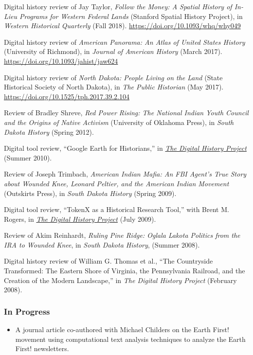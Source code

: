 Digital history review of Jay Taylor, \emph{Follow the Money: A Spatial
History of In-Lieu Programs for Western Federal Lands} (Stanford Spatial
History Project), in \emph{Western Historical Quarterly} (Fall 2018).
\url{https://doi.org/10.1093/whq/why049}

Digital history review of \emph{American Panorama: An Atlas of United
States History} (University of Richmond), in \emph{Journal of American
History} (March 2017). \url{https://doi.org/10.1093/jahist/jaw624}

Digital history review of \emph{North Dakota: People Living on the Land}
(State Historical Society of North Dakota), in \emph{The Public
Historian} (May 2017). \url{https://doi.org/10.1525/tph.2017.39.2.104}

Review of Bradley Shreve, \emph{Red Power Rising: The National Indian
Youth Council and the Origins of Native Activism} (University of
Oklahoma Press), in \emph{South Dakota History} (Spring 2012).

Digital tool review, ``Google Earth for Historians,'' in
\emph{\href{http://digitalhistory.unl.edu/t-reviews/geheppler.php}{The
Digital History Project}} (Summer 2010).

Review of Joseph Trimbach, \emph{American Indian Mafia: An FBI Agent's
True Story about Wounded Knee, Leonard Peltier, and the American Indian
Movement} (Outskirts Press), in \emph{South Dakota History} (Spring
2009).

Digital tool review, ``TokenX as a Historical Research Tool,'' with
Brent M. Rogers, in
\emph{\href{http://digitalhistory.unl.edu/t-reviews/tokenxhepplerrogers.php}{The
Digital History Project}} (July 2009).

Review of Akim Reinhardt, \emph{Ruling Pine Ridge: Oglala Lakota
Politics from the IRA to Wounded Knee}, in \emph{South Dakota History},
(Summer 2008).

Digital history review of William G. Thomas et al., ``The Countryside
Transformed: The Eastern Shore of Virginia, the Pennsylvania Railroad,
and the Creation of the Modern Landscape,'' in \emph{The Digital History
Project} (February 2008).

\hypertarget{in-progress}{%
\subsubsection{In Progress}\label{in-progress}}

\begin{itemize}
\tightlist
\item
  A journal article co-authored with Michael Childers on the Earth
  First! movement using computational text analysis techniques to
  analyze the Earth First! newsletters.
\end{itemize}

